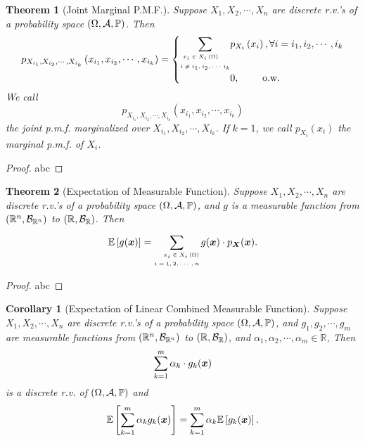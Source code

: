 \documentclass[openany,12pt]{book}
\newtheorem{theorem}{Theorem}[chapter]
\newtheorem{corollary}{Corollary}[chapter]
\begin{document}
\begin{theorem}[Joint Marginal P.M.F.]
  Suppose $X_1,X_2, \cdots,X_n$ are discrete r.v.'s of a probability space $(\Omega,\mathcal{A},\mathbb{P})$. Then
  \[p_{X_{i_{1}},X_{i_{2}}, \cdots,X_{i_{k}}}\left( x_{i_{1}},x_{i_{2}}, \cdots,x_{i_{k}} \right)= \left\{ \begin{aligned}
      \sum_{\mbox{\tiny$\begin{aligned}
                & x_{i} \in X_{i}\left( \Omega \right) \\
              i & \neq i_{1},i_{2},\cdots\,i_{k}       \\
            \end{aligned}$}} & {p_{X_i}\left( x_i \right), \forall i = i_{1},i_{2}, \cdots,i_{k}} \\
                                                       & 0,\qquad~\text{o.w.}~                                              \\
    \end{aligned} \right.\]
  We call $$p_{X_{i_1},X_{i_2}, \cdots,X_{i_k}}\left(x_{i_1},x_{i_2}, \cdots,x_{i_k}\right)$$ the joint p.m.f. marginalized over $X_{i_1},X_{i_2}, \cdots,X_{i_k}$.  If $k=1$, we call $p_{X_i}(x_i)$ the marginal p.m.f. of $X_i$.
\end{theorem}

\begin{proof}
  abc
\end{proof}

\begin{theorem}[Expectation of Measurable Function]
  Suppose $X_1, X_2, \cdots,X_n$ are discrete r.v.'s of a probability space $(\Omega,\mathcal{A},\mathbb{P})$, and $g$ is a measurable function from $(\mathbb{R}^n,  \mathcal{B}_{\mathbb{R}^n})$ to $(\mathbb{R}, \mathcal{B}_\mathbb{R})$. Then
  \[\mathbb{E}\left[ g(\bm{x}) \right] = \sum_{\mbox{\tiny$\begin{aligned}
            x_{i} \in X_{i}\left( \Omega \right) \\
            i = 1,2, \cdots,n                    \\
          \end{aligned}$}}^{}{g(\bm{x}) \cdot p_{\bm{X}}(\bm{x}).}\]
\end{theorem}

\begin{proof}
  abc
\end{proof}

\begin{corollary}[Expectation of Linear Combined Measurable Function]
  Suppose $X_1, X_2, \cdots,X_n$ are discrete r.v.'s of a probability space $(\Omega,\mathcal{A},\mathbb{P})$, and $g_1,g_2, \cdots,g_m$ are measurable functions from $(\mathbb{R}^n,\mathcal{B}_{\mathbb{R}^n})$ to $(\mathbb{R},\mathcal{B}_\mathbb{R})$, and $\alpha_1,\alpha_2, \cdots,\alpha_m\in\mathbb{R}$,
  Then $$\sum_{k=1}^{m}\alpha_k\cdot g_k(\bm{x})$$ is a discrete r.v. of $(\Omega,\mathcal{A},\mathbb{P})$ and
  \[\mathbb{E}\left[ \sum_{k = 1}^{m}\alpha_{k}g_{k}(\bm{x}) \right] = \sum_{k = 1}^{m}\alpha_{k}\mathbb{E}\left[ g_{k}(\bm{x}) \right].\]
\end{corollary}
\end{document}
